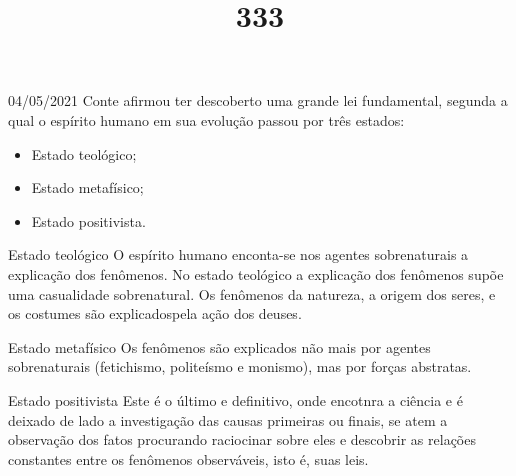 \documentclass{SchoolBook}
\begin{document}
    \begin{day}{04/05/2021}
        Conte afirmou ter descoberto uma grande lei fundamental, segunda a qual o espírito humano em sua evolução passou por três estados:

        \vspace{6pt}
        \begin{itemize}[nosep]
            \item Estado teológico;
            \item Estado metafísico;
            \item Estado positivista.
        \end{itemize}

        \title{3}{Estado teológico}
        O espírito humano enconta-se nos agentes sobrenaturais a explicação dos fenômenos. No estado teológico a explicação dos fenômenos supõe uma casualidade sobrenatural. Os fenômenos da natureza, a origem dos seres, e os costumes são explicadospela ação dos deuses.

        \title{3}{Estado metafísico}
        Os fenômenos são explicados não mais por agentes sobrenaturais (fetichismo, politeísmo e monismo), mas por forças abstratas.

        \title{3}{Estado positivista}
        Este é o último e definitivo, onde encotnra a ciência e é deixado de lado a investigação das causas primeiras ou finais, se atem a observação dos fatos procurando raciocinar sobre eles e descobrir as relações constantes entre os fenômenos observáveis, isto é, suas leis.
    \end{day}
\end{document}
